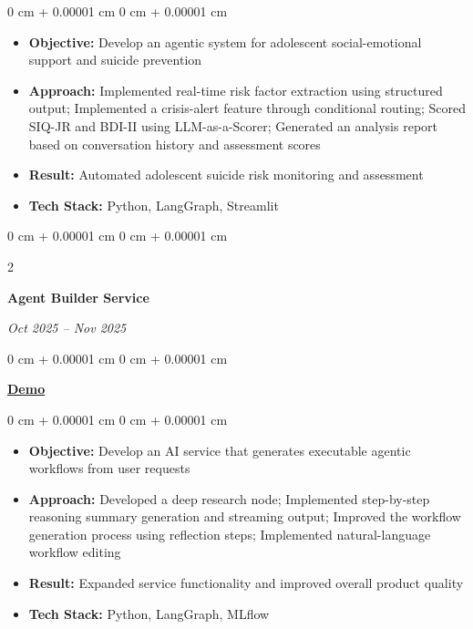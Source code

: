 \documentclass[10pt, letterpaper]{article}
\newenvironment{highlights}{
    \begin{itemize}[
        topsep=0.10 cm,
        parsep=0.10 cm,
        partopsep=0pt,
        itemsep=0pt,
        leftmargin=0 cm + 10pt
    ]
}{
    \end{itemize}
} %
\newenvironment{onecolentry}{
    \begin{adjustwidth}{
        0 cm + 0.00001 cm
    }{
        0 cm + 0.00001 cm
    }
}{
    \end{adjustwidth}
} %
\newenvironment{twocolentry}[2][]{
    \onecolentry
    \def\secondColumn{\textit{#2}}
    \setcolumnwidth{\fill, 4.5 cm}
    \begin{paracol}{2}
}{
    \switchcolumn \raggedleft \secondColumn
    \end{paracol}
    \endonecolentry
} %
\begin{document}
        \vspace{0.10 cm}
        \begin{onecolentry}
            \begin{highlights}
                \item \textbf{Objective:} Develop an agentic system for adolescent social-emotional support and suicide prevention
                \item \textbf{Approach:} Implemented real-time risk factor extraction using structured output; Implemented a crisis-alert feature through conditional routing; Scored SIQ-JR and BDI-II using LLM-as-a-Scorer; Generated an analysis report based on conversation history and assessment scores
                \item \textbf{Result:} Automated adolescent suicide risk monitoring and assessment
                \item \textbf{Tech Stack:} Python, LangGraph, Streamlit
            \end{highlights}
        \end{onecolentry}

        \vspace{0.2 cm}
        \begin{twocolentry}{
            Oct 2025 -- Nov 2025
        }
            \textbf{Agent Builder Service}
        \end{twocolentry}
        \begin{onecolentry}
            \href{https://drive.google.com/file/d/1WF-cKsFLpeKYJn3NkBkesCdnmcinfLIx/view?usp=sharing}{\textbf{Demo}}
        \end{onecolentry}
            
        \vspace{0.10 cm}
        \begin{onecolentry}
            \begin{highlights}
                \item \textbf{Objective:} Develop an AI service that generates executable agentic workflows from user requests
                \item \textbf{Approach:} Developed a deep research node; Implemented step-by-step reasoning summary generation and streaming output; Improved the workflow generation process using reflection steps; Implemented natural-language workflow editing
                \item \textbf{Result:} Expanded service functionality and improved overall product quality
                \item \textbf{Tech Stack:} Python, LangGraph, MLflow
            \end{highlights}
        \end{onecolentry}
\end{document}
